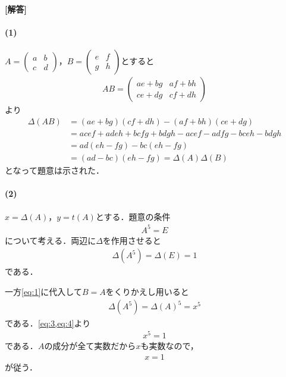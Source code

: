 \documentclass[../../main.tex]{subfiles}
\begin{document}
\begin{oframed}
  
\end{oframed}

{\bf [解答]}

\paragraph{(1)}

$A=
\begin{pmatrix}a&b\\c&d
\end{pmatrix}$，$B=
\begin{pmatrix}e&f\\g&h
\end{pmatrix}$とすると
\begin{align}
  AB=
  \begin{pmatrix}ae+bg&af+bh\\ce+dg&cf+dh
  \end{pmatrix}
\end{align}
より
\begin{align}
  \Delta(AB)&=(ae+bg)(cf+dh)-(af+bh)(ce+dg)\\
  &=acef+adeh+bcfg+bdgh-acef-adfg-bceh-bdgh\\
  &=ad(eh-fg)-bc(eh-fg) \\
  &=(ad-bc)(eh-fg)=\Delta(A)\Delta(B) \label{eq:1}
\end{align}
となって題意は示された．

\paragraph{(2)}

$x=\Delta(A)$，$y=t(A)$とする．題意の条件
\begin{align}
  A^5 = E \label{eq:2}
\end{align}
について考える．両辺に$\Delta$を作用させると
\begin{align}
  \Delta(A^5) = \Delta(E) = 1 \label{eq:3}
\end{align}
である．

一方\cref{eq:1}に代入して$B=A$をくりかえし用いると
\begin{align}
  \Delta(A^5)=\Delta(A)^5=x^5 \label{eq:4}
\end{align}
である．\cref{eq:3,eq:4}より
\begin{align}
  x^5 = 1
\end{align}
である．$A$の成分が全て実数だから$x$も実数なので，
\begin{align}
  x = 1 \label{eq:5}
\end{align}
が従う．
\end{document}
